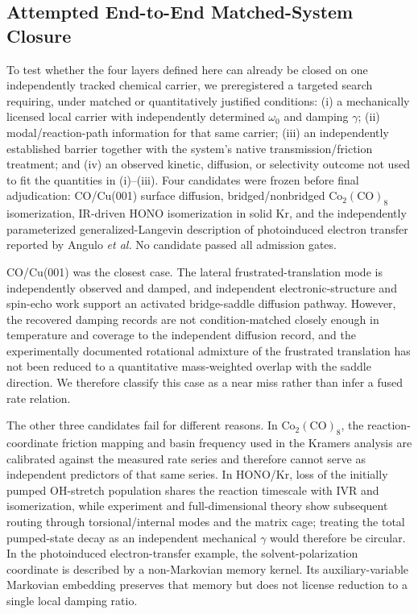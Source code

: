 
\subsection{Attempted End-to-End Matched-System Closure}
\label{sec:matched_closure}

To test whether the four layers defined here can already be closed on one
independently tracked chemical carrier, we preregistered a targeted search
requiring, under matched or quantitatively justified conditions:
(i) a mechanically licensed local carrier with independently determined
$\omega_0$ and damping $\gamma$;
(ii) modal/reaction-path information for that same carrier;
(iii) an independently established barrier together with the system's native
transmission/friction treatment; and
(iv) an observed kinetic, diffusion, or selectivity outcome not used to fit
the quantities in (i)--(iii).
Four candidates were frozen before final adjudication:
CO/Cu(001) surface diffusion, bridged/nonbridged
$\mathrm{Co_2(CO)_8}$ isomerization, IR-driven HONO isomerization in solid Kr,
and the independently parameterized generalized-Langevin description of
photoinduced electron transfer reported by Angulo \emph{et al.}
No candidate passed all admission gates.

CO/Cu(001) was the closest case.  The lateral frustrated-translation mode is
independently observed and damped, and independent electronic-structure and
spin-echo work support an activated bridge-saddle diffusion pathway.
However, the recovered damping records are not condition-matched closely
enough in temperature and coverage to the independent diffusion record, and
the experimentally documented rotational admixture of the frustrated
translation has not been reduced to a quantitative mass-weighted overlap with
the saddle direction.  We therefore classify this case as a near miss rather
than infer a fused rate relation.

The other three candidates fail for different reasons.  In
$\mathrm{Co_2(CO)_8}$, the reaction-coordinate friction mapping and basin
frequency used in the Kramers analysis are calibrated against the measured
rate series and therefore cannot serve as independent predictors of that same
series.  In HONO/Kr, loss of the initially pumped OH-stretch population shares
the reaction timescale with IVR and isomerization, while experiment and
full-dimensional theory show subsequent routing through torsional/internal
modes and the matrix cage; treating the total pumped-state decay as an
independent mechanical $\gamma$ would therefore be circular.  In the
photoinduced electron-transfer example, the solvent-polarization coordinate is
described by a non-Markovian memory kernel.  Its auxiliary-variable Markovian
embedding preserves that memory but does not license reduction to a single
local damping ratio.


